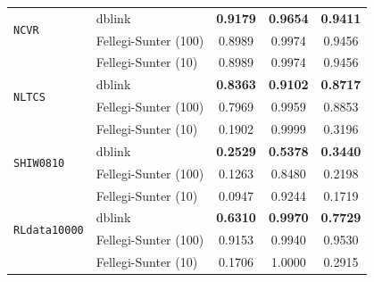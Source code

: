 \documentclass[compress]{beamer}
\newcommand{\1}[1]{\mathbb{I}\!\left[#1\right]} %
\theoremstyle{plain}
\begin{document}
{{\begin{table}
\begin{tabular}{l l *{3}{c}}
		 
		\midrule
		\multirow{2}{*}{\texttt{NCVR}}
		 & dblink                 & \textbf{0.9179} & \textbf{0.9654} & \textbf{0.9411} \\
		 & Fellegi-Sunter (100)  & 0.8989 & {0.9974} & {0.9456} \\
		 & Fellegi-Sunter (10)  & 0.8989 & {0.9974} & {0.9456} \\
		\midrule
		\multirow{2}{*}{\texttt{NLTCS}}
		 & dblink                  & \textbf{0.8363} &  \textbf{0.9102} &  \textbf{0.8717} \\
		 & Fellegi-Sunter (100)  & 0.7969 & {0.9959} & {0.8853} \\
		  & Fellegi-Sunter (10)  & 0.1902 & {0.9999} & {0.3196} \\
		\midrule
		\multirow{2}{*}{\texttt{SHIW0810}}
		 & dblink                  & \textbf{0.2529} & \textbf{0.5378} & \textbf{0.3440} \\
		 & Fellegi-Sunter (100)  & 0.1263 & {0.8480} & 0.2198 \\
		& Fellegi-Sunter (10)  & 0.0947 & {0.9244} & 0.1719 \\
		\midrule
		\multirow{2}{*}{\texttt{RLdata10000}}
		 & dblink                  & \textbf{0.6310} & \textbf{0.9970} & \textbf{0.7729} \\
		 & Fellegi-Sunter (100)  & {0.9153} & {0.9940} & {0.9530} \\
		 & Fellegi-Sunter (10)  & 0.1706 & {1.0000} & 0.2915 \\
		\bottomrule
	\end{tabular}
\end{table}
}



}
\end{document}
